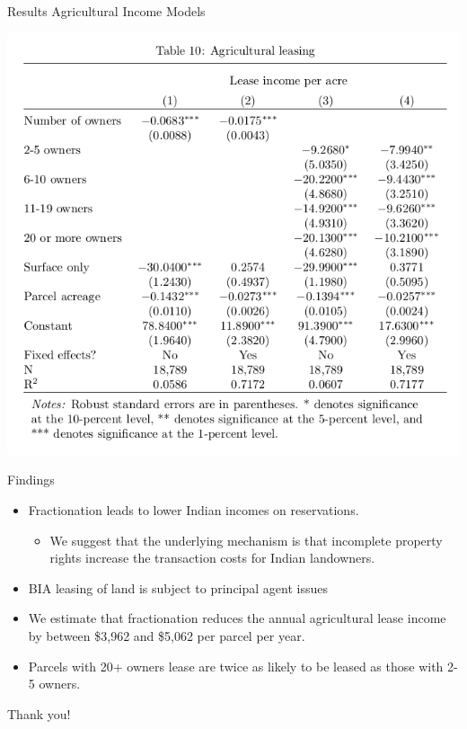 \documentclass[ignorenonframetext,]{beamer}
\begin{document}
\begin{frame}{Results Agricultural Income Models}

\centering
\includegraphics{Table10.png}

\end{frame}

\begin{frame}{Findings}

\begin{itemize}
\item
  Fractionation leads to lower Indian incomes on reservations.

  \begin{itemize}
  \itemsep1pt\parskip0pt
  \item
    We suggest that the underlying mechanism is that incomplete property
    rights increase the transaction costs for Indian landowners.
  \end{itemize}
\item
  BIA leasing of land is subject to principal agent issues
\item
  We estimate that fractionation reduces the annual agricultural lease
  income by between \$3,962 and \$5,062 per parcel per year.
\item
  Parcels with 20+ owners lease are twice as likely to be leased as
  those with 2-5 owners.
\end{itemize}

\end{frame}

\begin{frame}

\begin{center}

\huge{Thank you!}

\end{center}

\end{frame}
\end{document}
